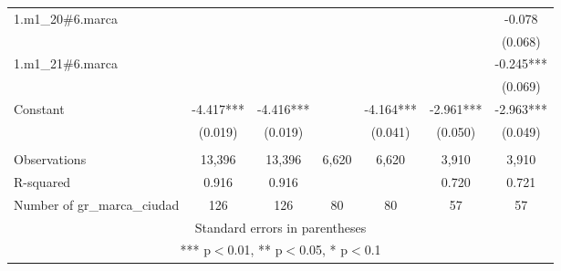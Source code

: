\begin{tabular}{lcccccc}
1.m1\_20\#6.marca &  &  &  &  &  & -0.078 \\
 &  &  &  &  &  & (0.068) \\
1.m1\_21\#6.marca &  &  &  &  &  & -0.245*** \\
 &  &  &  &  &  & (0.069) \\
Constant & -4.417*** & -4.416*** &  & -4.164*** & -2.961*** & -2.963*** \\
 & (0.019) & (0.019) &  & (0.041) & (0.050) & (0.049) \\
 &  &  &  &  &  &  \\
Observations & 13,396 & 13,396 & 6,620 & 6,620 & 3,910 & 3,910 \\
R-squared & 0.916 & 0.916 &  &  & 0.720 & 0.721 \\
 Number of gr\_marca\_ciudad & 126 & 126 & 80 & 80 & 57 & 57 \\ \hline
\multicolumn{7}{c}{ Standard errors in parentheses} \\
\multicolumn{7}{c}{ *** p$<$0.01, ** p$<$0.05, * p$<$0.1} \\
\end{tabular}
